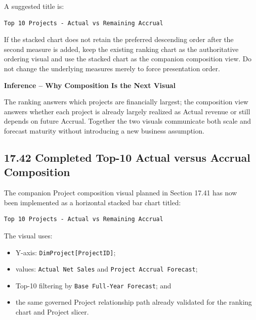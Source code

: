 \documentclass[11pt,a4paper]{article}
\begin{document}
A suggested title is:

\begin{lstlisting}[style=powerquery]
Top 10 Projects - Actual vs Remaining Accrual
\end{lstlisting}

If the stacked chart does not retain the preferred descending order after the
second measure is added, keep the existing ranking chart as the authoritative
ordering visual and use the stacked chart as the companion composition view.
Do not change the underlying measures merely to force presentation order.

\begin{inferencebox}

\textbf{Inference -- Why Composition Is the Next Visual}

The ranking answers which projects are financially largest; the composition
view answers whether each project is already largely realized as Actual revenue
or still depends on future Accrual. Together the two visuals communicate both
scale and forecast maturity without introducing a new business assumption.

\end{inferencebox}


\subsection{17.42 Completed Top-10 Actual versus Accrual Composition}

The companion Project composition visual planned in Section 17.41 has now been
implemented as a horizontal stacked bar chart titled:

\begin{lstlisting}[style=powerquery]
Top 10 Projects - Actual vs Remaining Accrual
\end{lstlisting}

The visual uses:

\begin{itemize}[leftmargin=7mm,itemsep=2pt]
    \item Y-axis: \texttt{DimProject[ProjectID]};
    \item values: \texttt{Actual Net Sales} and
    \texttt{Project Accrual Forecast};
    \item Top-10 filtering by \texttt{Base Full-Year Forecast}; and
    \item the same governed Project relationship path already validated for the
    ranking chart and Project slicer.
\end{itemize}
\end{document}
